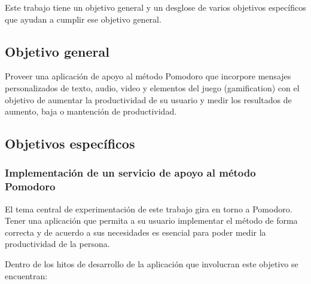 \documentclass[12pt,letterpaper]{report}
\begin{document}
Este trabajo tiene un objetivo general y un desglose de varios
objetivos específicos que ayudan a cumplir ese objetivo general.

\subsection{Objetivo general}\label{objetivo-general}

Proveer una aplicación de apoyo al método Pomodoro que incorpore
mensajes personalizados de texto, audio, video y elementos del juego
(gamification) con el objetivo de aumentar la productividad de su
usuario y medir los resultados de aumento, baja o mantención de
productividad.

\subsection{Objetivos específicos}\label{objetivos-especificos}

\subsubsection{Implementación de un servicio de apoyo al método Pomodoro}\label{implementacion-de-un-servicio-de-apoyo-a-pomodoro}

El tema central de experimentación de este trabajo gira en torno a
Pomodoro. Tener una aplicación que permita a su usuario implementar el
método de forma correcta y de acuerdo a sus necesidades es esencial
para poder medir la productividad de la persona.

Dentro de los hitos de desarrollo de la aplicación que involucran este objetivo se encuentran:
\end{document}
